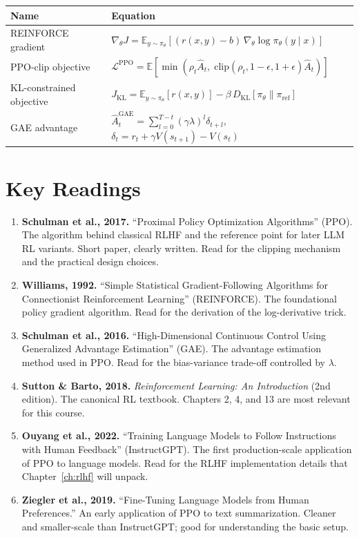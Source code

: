 \begin{center}
\begin{tabularx}{\textwidth}{@{}lX@{}}
\toprule
\textbf{Name} & \textbf{Equation} \\
\midrule
REINFORCE gradient & $\nabla_\theta J = \mathbb{E}_{y \sim \pi_\theta}\!\left[(r(x,y) - b) \, \nabla_\theta \log \pi_\theta(y \mid x)\right]$ \\[6pt]
PPO-clip objective & $\mathcal{L}^{\text{PPO}} = \mathbb{E}\!\left[\min\!\left(\rho_t \hat{A}_t, \; \text{clip}(\rho_t, 1{-}\epsilon, 1{+}\epsilon) \hat{A}_t\right)\right]$ \\[6pt]
KL-constrained objective & $J_{\text{KL}} = \mathbb{E}_{y \sim \pi_\theta}\!\left[r(x,y)\right] - \beta \, D_{\text{KL}}\!\left[\pi_\theta \| \pi_{\text{ref}}\right]$ \\[6pt]
GAE advantage & $\hat{A}_t^{\text{GAE}} = \sum_{l=0}^{T-t}(\gamma\lambda)^l \delta_{t+l}$, \quad $\delta_t = r_t + \gamma V(s_{t+1}) - V(s_t)$ \\
\bottomrule
\end{tabularx}
\end{center}


\section*{Key Readings}

\begin{enumerate}[nosep]
  \item \textbf{Schulman et al., 2017.} ``Proximal Policy Optimization Algorithms'' (PPO). The algorithm behind classical RLHF and the reference point for later LLM RL variants. Short paper, clearly written. Read for the clipping mechanism and the practical design choices.
  \item \textbf{Williams, 1992.} ``Simple Statistical Gradient-Following Algorithms for Connectionist Reinforcement Learning'' (REINFORCE). The foundational policy gradient algorithm. Read for the derivation of the log-derivative trick.
  \item \textbf{Schulman et al., 2016.} ``High-Dimensional Continuous Control Using Generalized Advantage Estimation'' (GAE). The advantage estimation method used in PPO. Read for the bias-variance trade-off controlled by $\lambda$.
  \item \textbf{Sutton \& Barto, 2018.} \emph{Reinforcement Learning: An Introduction} (2nd edition). The canonical RL textbook. Chapters 2, 4, and 13 are most relevant for this course.
  \item \textbf{Ouyang et al., 2022.} ``Training Language Models to Follow Instructions with Human Feedback'' (InstructGPT). The first production-scale application of PPO to language models. Read for the RLHF implementation details that Chapter~\ref{ch:rlhf} will unpack.
  \item \textbf{Ziegler et al., 2019.} ``Fine-Tuning Language Models from Human Preferences.'' An early application of PPO to text summarization. Cleaner and smaller-scale than InstructGPT; good for understanding the basic setup.
\end{enumerate}

\flushbottom
